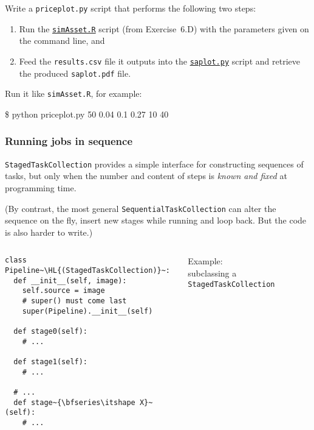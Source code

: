 \documentclass[english,serif,mathserif,xcolor=pdftex,dvipsnames,table]{beamer}
\begin{document}
\begin{frame}
  \begin{exercise*}[8.A]

    Write a \texttt{priceplot.py} script that performs the following two steps:
    \begin{enumerate}
    \item Run the
      \href{https://github.com/uzh/gc3pie/blob/master/docs/programmers/tutorials/workflows/downloads/simAsset.R}{\texttt{simAsset.R}}
      script (from Exercise~6.D) with the parameters given on the command line,
      and
    \item Feed the \texttt{results.csv} file it outputs into the
      \href{https://github.com/uzh/gc3pie/blob/master/docs/programmers/tutorials/workflows/downloads/saplot.py}{\texttt{saplot.py}}
      script and retrieve the produced \texttt{saplot.pdf} file.
    \end{enumerate}

    \+
    Run it like \texttt{simAsset.R}, for example:
\begin{semiverbatim}
  \$ python priceplot.py 50 0.04 0.1 0.27 10 40
\end{semiverbatim}

  \end{exercise*}
\end{frame}


\begin{frame}[fragile]
  \frametitle{Running jobs in sequence}

  \texttt{StagedTaskCollection} provides a simple interface for
  constructing sequences of tasks, but only when the number and
  content of steps is \emph{known and fixed} at programming time.

  \+
  (By contrast, the most general \texttt{SequentialTaskCollection}
  can alter the sequence on the fly, insert new stages while running
  and loop back. But the code is also harder to write.)
\end{frame}


\begin{frame}[fragile]
  \begin{columns}[t]
    \begin{column}{0.6\textwidth}
\begin{lstlisting}[basicstyle=\footnotesize\ttfamily]
class Pipeline~\HL{(StagedTaskCollection)}~:
  def __init__(self, image):
    self.source = image
    # super() must come last
    super(Pipeline).__init__(self)

  def stage0(self):
    # ...

  def stage1(self):
    # ...

  # ...
  def stage~{\bfseries\itshape X}~(self):
    # ...
      \end{lstlisting}
    \end{column}
    \begin{column}{0.4\textwidth}
      \raggedleft

      \+\+\small
      Example: \\
      subclassing a
      \texttt{StagedTaskCollection}
    \end{column}
  \end{columns}
\end{frame}
\end{document}
